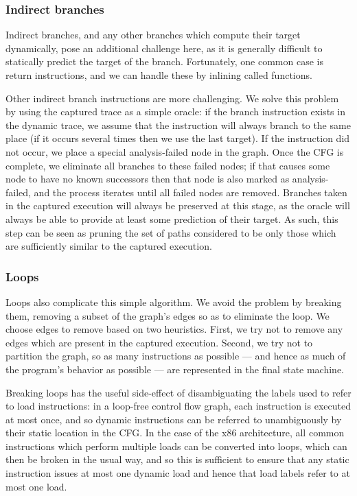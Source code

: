 \documentclass[10pt,letter,twocolumn]{sigplanconf}
\begin{document}
\subsubsection{Indirect branches}
\label{sect:indirect_branches}
Indirect branches, and any other branches which compute their target
dynamically, pose an additional challenge here, as it is generally
difficult to statically predict the target of the branch.
Fortunately, one common case is return instructions, and we can handle
these by inlining called functions.

Other indirect branch instructions are more challenging.  We solve
this problem by using the captured trace as a simple oracle: if the
branch instruction exists in the dynamic trace, we assume that the
instruction will always branch to the same place (if it occurs several
times then we use the last target).  If the instruction did not occur,
we place a special analysis-failed node in the graph.  Once the CFG is
complete, we eliminate all branches to these failed nodes; if that
causes some node to have no known successors then that node is also
marked as analysis-failed, and the process iterates until all failed
nodes are removed.  Branches taken in the captured execution will
always be preserved at this stage, as the oracle will always be able
to provide at least some prediction of their target.  As such, this
step can be seen as pruning the set of paths considered to be only
those which are sufficiently similar to the captured execution.

\subsubsection{Loops}
\label{sect:loops}
Loops also complicate this simple algorithm.  We avoid the problem by
breaking them, removing a subset of the graph's edges so as to
eliminate the loop.  We choose edges to remove based on two
heuristics.  First, we try not to remove any edges which are present
in the captured execution.  Second, we try not to partition the graph,
so as many instructions as possible --- and hence as much of the
program's behavior as possible --- are represented in the final state
machine.

Breaking loops has the useful side-effect of disambiguating the labels
used to refer to load instructions: in a loop-free control flow graph,
each instruction is executed at most once, and so dynamic instructions
can be referred to unambiguously by their static location in the CFG.
In the case of the x86 architecture, all common instructions which
perform multiple loads can be converted into loops, which can then be
broken in the usual way, and so this is sufficient to ensure that any
static instruction issues at most one dynamic load and hence that load
labels refer to at most one load.
\end{document}
